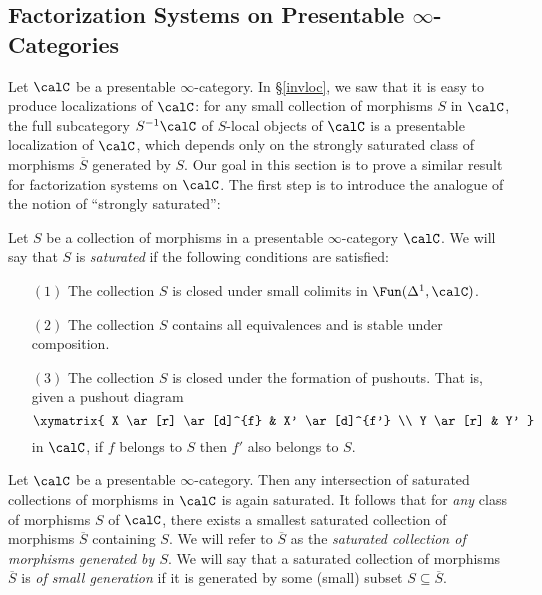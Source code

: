 \subsection{Factorization Systems on Presentable $\infty$-Categories}\label{factgen2}

Let $\calC$ be a presentable $\infty$-category. In \S \ref{invloc}, we saw that it is easy to produce localizations of $\calC$: for any small collection of morphisms $S$ in $\calC$, the full subcategory $S^{-1} \calC$ of $S$-local objects of $\calC$ is a presentable localization of $\calC$, which depends only on the strongly saturated class of morphisms $\overline{S}$ generated by $S$. Our goal in this section is to prove a similar result for factorization systems on
$\calC$. The first step is to introduce the analogue of the notion of ``strongly saturated'':

\begin{definition}
Let $S$ be a collection of morphisms in a presentable $\infty$-category $\calC$. We will say that
$S$ is {\it saturated} if the following conditions are satisfied:
\begin{itemize}
\item[$(1)$] The collection $S$ is closed under small colimits in $\Fun( \Delta^1, \calC)$.
\item[$(2)$] The collection $S$ contains all equivalences and is stable under composition.
\item[$(3)$] The collection $S$ is closed under the formation of pushouts. That is, given a pushout diagram
$$ \xymatrix{ X \ar[r] \ar[d]^{f} & X' \ar[d]^{f'} \\
Y \ar[r] & Y' }$$
in $\calC$, if $f$ belongs to $S$ then $f'$ also belongs to $S$.
\end{itemize}
\end{definition}

\begin{remark}
Let $\calC$ be a presentable $\infty$-category. Then any intersection of saturated collections of morphisms in $\calC$ is again saturated. It follows that for {\em any} class of morphisms $S$ of $\calC$, there exists a smallest saturated collection of morphisms $\overline{S}$ containing $S$. We will refer to $\overline{S}$ as the {\it saturated collection of morphisms generated by $S$}. We will say that a saturated collection of morphisms $\overline{S}$ is {\it of small generation} if it
is generated by some (small) subset $S \subseteq \overline{S}$.
\end{remark}

